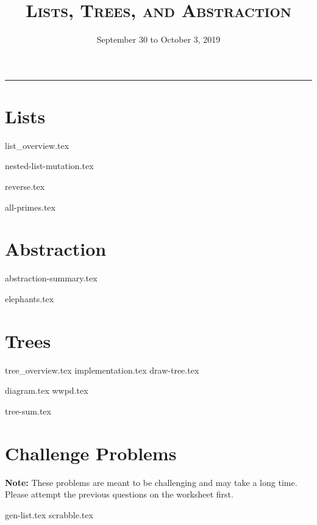 \documentclass{exam}
\title{\textsc{Lists, Trees, and Abstraction}}
\date{September 30 to October 3, 2019}
\begin{document}
\maketitle
\rule{\textwidth}{0.15em}
\fontsize{12}{15}\selectfont


\section{Lists}
{list_overview.tex}
\begin{questions}
{nested-list-mutation.tex}

\begin{blocksection}
{reverse.tex}
\end{blocksection}

\begin{blocksection}
{all-primes.tex}
\end{blocksection}
\end{questions}

\newpage
\section{Abstraction}
{abstraction-summary.tex}
\begin{questions}
{elephants.tex}

\end{questions}

\newpage
\section{Trees}
{tree_overview.tex}
{implementation.tex}
{draw-tree.tex}
\newpage
\begin{questions}
{diagram.tex}
{wwpd.tex}

{tree-sum.tex}

\end{questions}

\newpage
\section{Challenge Problems}
\textbf{Note:} These problems are meant to be challenging and may take a long time. Please attempt the previous questions on the worksheet first.
\begin{questions}
{gen-list.tex}
\newpage
{scrabble.tex}
\end{questions}
\end{document}
